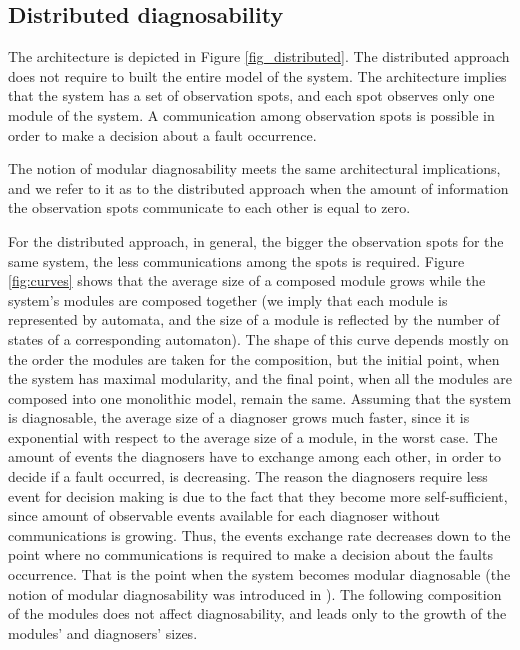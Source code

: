 \subsection{Distributed diagnosability}
The architecture is depicted in Figure \ref{fig_distributed}.
The distributed approach does not require to built the entire model of the
system. The architecture implies that the system has a set of observation spots,
and each spot observes only one module of the system. A communication among
observation spots is possible in order to make a decision about a fault
occurrence.


The notion of modular diagnosability meets the same architectural implications,
and we refer to it as to the distributed approach when the amount of information
the observation spots communicate to each other is equal to zero. 

For the distributed approach, in general, the bigger the observation spots for
the same system, the less communications among the spots is required.
Figure \ref{fig:curves} shows that the average size of a composed module grows
while the system's modules are composed together (we imply that each module is
represented by automata, and the size of a module is reflected by the number of
states of a corresponding automaton).
The shape of this curve depends mostly on the order the modules are taken for
the composition, but the initial point, when the system has maximal modularity,
and the final point, when all the modules are composed into one monolithic
model, remain the same. Assuming that the system is diagnosable, the average
size of a diagnoser grows much faster, since it is exponential with respect to
the average size of a module, in the worst case.
The amount of events the diagnosers have to exchange among each other, in order
to decide if a fault occurred, is decreasing. The reason the diagnosers require
less event for decision making is due to the fact that they become more
self-sufficient, since amount of observable events available for each
diagnoser without communications is growing. Thus, the events exchange rate
decreases down to the point where no communications is required to make a
decision about the faults occurrence. That is the point when the system becomes
modular diagnosable (the notion of modular diagnosability was introduced in
\cite{contant_diagnosability_2006}). The following composition of the modules
does not affect diagnosability, and leads only to the growth of the modules' and
diagnosers' sizes.

